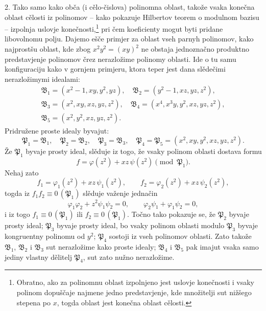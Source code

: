 \documentclass[11pt]{article}
\newcommand{\ideal}[1]{\mathfrak{#1}}
\newcommand{\eqzero}[1]{\equiv 0\,(#1)}
\begin{document}
2. Tako samo kako obča (i cělo-čislova) polinomna oblast, takože vsaka konečna oblast cělosti iz polinomov -- kako pokazuje Hilbertov teorem o modulnom bazisu -- izpolnja uslovje konečnosti,\footnote{Obratno, ako za polinomnu oblast izpolnjeno jest uslovje konečnosti i vsaky polinom dopuščaje najmene jedno predstavjenje, kde množitelji sut nižšego stepena po \(x\), togda oblast jest konečna oblast cělosti.} pri čem koeficienty mogut byti pridane libovolnomu polju. Dajemo ešče primjer za oblast vseh parnyh polinomov, kako najprostšu oblast, kde zbog \(x^2y^2=(xy)^2\) ne obstaja jednoznačno produktno predstavjenje polinomov črez nerazložime polinomy oblasti. Ide o tu samu konfiguraciju kako v gornjem primjeru, ktora teper jest dana slědečimi nerazložimymi idealami:
\[
\begin{gathered}
 \ideal B_1=(x^2-1,xy,y^2,yz),\quad
 \ideal B_2=(y^2-1,xz,yz,z^2),\\
 \ideal B_3=(x^2,xy,xz,yz,z^2),\quad
 \ideal B_4=(x^4,x^3y,y^2,xz,yz,z^2),\\
 \ideal B_5=(x^2,y^2,xz,yz,z^2).
\end{gathered}
\]
Pridružene proste idealy byvajut:
\[
 \ideal P_1=\ideal B_1,
 \quad \ideal P_2=\ideal B_2,
 \quad \ideal P_3=\ideal B_3,
 \quad \ideal P_4=\ideal P_5=(x^2,xy,y^2,xz,yz,z^2).
\]
Že \(\ideal P_1\) byvaje prosty ideal, slěduje iz togo, že vsaky polinom oblasti dostava formu
\[
 f=\varphi(z^2)+xz\,\psi(z^2)\pmod{\ideal P_1}.
\]
Nehaj zato
\[
 f_1=\varphi_1(z^2)+xz\,\psi_1(z^2),
 \qquad
 f_2=\varphi_2(z^2)+xz\,\psi_2(z^2),
\]
togda iz \(f_1f_2\eqzero{\ideal P_1}\) slěduje važenje jednačin
\[
 \varphi_1\varphi_2+z^2\psi_1\psi_2=0,
 \qquad
 \varphi_2\psi_1+\varphi_1\psi_2=0,
\]
i iz togo \(f_1\eqzero{\ideal P_1}\) ili \(f_2\eqzero{\ideal P_1}\). Točno tako pokazuje se, že \(\ideal P_2\) byvaje prosty ideal; \(\ideal P_3\) byvaje prosty ideal, bo vsaky polinom oblasti modulo \(\ideal P_3\) byvaje kongruentny polinomu od \(y^2\); \(\ideal P_4\) sostoji iz vseh polinomov oblasti. Zato takože \(\ideal B_1\), \(\ideal B_2\) i \(\ideal B_3\) sut nerazložime kako proste idealy; \(\ideal B_4\) i \(\ideal B_5\) pak imajut vsaka samo jediny vlastny dělitelj \(\ideal P_4\), sut zato nužno nerazložime.
\end{document}
